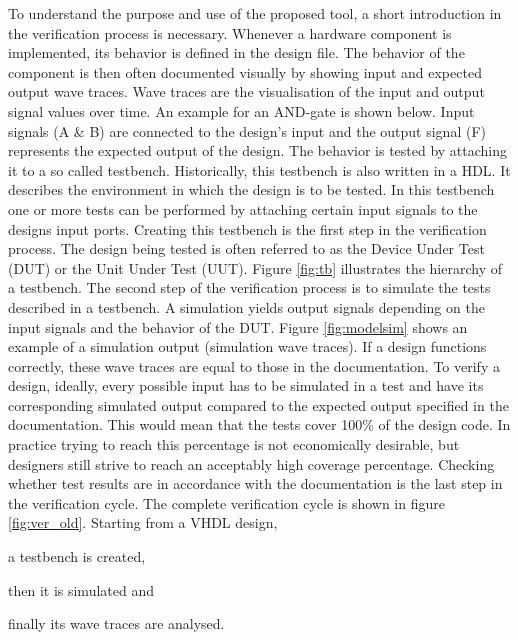 \npar
To understand the purpose and use of the proposed tool, a short introduction in the verification process is necessary.
\newpage\noindent
Whenever a hardware component is implemented, its behavior is defined in the design file. The behavior of the component is then often documented visually by showing input and expected output wave traces. Wave traces are the visualisation of the input and output signal values over time. An example for an AND-gate is shown below. Input signals (A \& B) are connected to the design's input and the output signal (F) represents the expected output of the design.\nline
{}\nline
The behavior is tested by attaching it to a so called testbench.  Historically, this testbench is also written in a HDL. It describes the environment in which the design is to be tested. In this testbench one or more tests can be performed by attaching certain input signals to the designs input ports. Creating this testbench is the first step in the verification process. The design being tested is often referred to as the Device Under Test (DUT) or the Unit Under Test (UUT). Figure \ref{fig:tb} illustrates the hierarchy of a testbench.
\nline
The second step of the verification process is to simulate the tests described in a testbench. A simulation yields output signals depending on the input signals and the behavior of the DUT. Figure \ref{fig:modelsim} shows an example of a simulation output (simulation wave traces). If a design functions correctly, these wave traces are equal to those in the documentation.
\nline
To verify a design, ideally,  every possible input has to be simulated in a test and have its corresponding simulated output compared to the expected output specified in the documentation. This would mean that the tests cover 100\% of the design code. In practice trying to reach this percentage is not economically desirable, but designers still strive to reach an acceptably high coverage percentage. Checking whether test results are in accordance with the documentation is the last step in the verification cycle.
\npar
The complete verification cycle is shown in figure \ref{fig:ver_old}. Starting from  a VHDL design,
\begin{inparaenum}[a)]
	\item a testbench is created, 
	\item then it is simulated and
	\item finally its wave traces are analysed.
\end{inparaenum}
